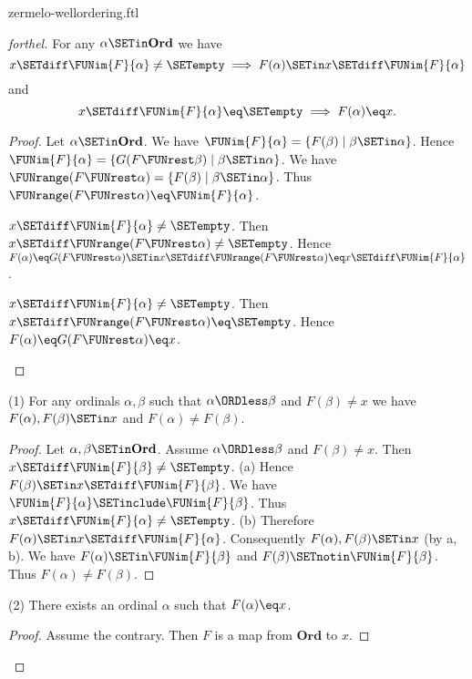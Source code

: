 \documentclass{article}
\newcommand\Ord{\textbf{Ord}}
\begin{document}
\begin{smodule}{zermelo-wellordering.ftl}
\begin{proof}[forthel]
  For any $\alpha \SETin \Ord$ we have
  \[ x \SETdiff \FUNim{F}{\alpha} \neq \SETempty \implies F(\alpha) \SETin x \SETdiff \FUNim{F}{\alpha} \]
  and
  \[ x \SETdiff \FUNim{F}{\alpha} \eq \SETempty \implies F(\alpha) \eq x. \]
  \begin{proof}
    Let $\alpha \SETin \Ord$.
    We have $\FUNim{F}{\alpha} = \{ F(\beta) \mid \beta \SETin \alpha \}$.
    Hence $\FUNim{F}{\alpha} = \{ G(F \FUNrest \beta) \mid \beta \SETin \alpha \}$.
    We have $\FUNrange(F \FUNrest \alpha) = \{ F(\beta) \mid \beta \SETin \alpha \}$.
    Thus $\FUNrange(F \FUNrest \alpha) \eq \FUNim{F}{\alpha}$.

    \begin{case}{$x \SETdiff \FUNim{F}{\alpha} \neq \SETempty$.}
      Then $x \SETdiff \FUNrange(F \FUNrest \alpha) \neq \SETempty$.
      Hence $F(\alpha)
        \eq G(F \FUNrest \alpha)
        \SETin x \SETdiff \FUNrange(F \FUNrest \alpha)
        \eq x \SETdiff \FUNim{F}{\alpha}$.
    \end{case}

    \begin{case}{$x \SETdiff \FUNim{F}{\alpha} \neq \SETempty$.}
      Then $x \SETdiff \FUNrange(F \FUNrest \alpha) \eq \SETempty$.
      Hence $F(\alpha)
        \eq G(F \FUNrest \alpha)
        \eq x$.
    \end{case}
  \end{proof}

  (1) For any ordinals $\alpha, \beta$ such that $\alpha \ORDless \beta$ and $F(\beta) \neq x$ we have $F(\alpha), F(\beta) \SETin x$ and $F(\alpha) \neq F(\beta)$.
  \begin{proof}
    Let $\alpha, \beta \SETin \Ord$.
    Assume $\alpha \ORDless \beta$ and $F(\beta) \neq x$.
    Then $x \SETdiff \FUNim{F}{\beta} \neq \SETempty$.
    (a) Hence $F(\beta) \SETin x \SETdiff \FUNim{F}{\beta}$.
    We have $\FUNim{F}{\alpha} \SETinclude \FUNim{F}{\beta}$.
    Thus $x \SETdiff \FUNim{F}{\alpha} \neq \SETempty$.
    (b) Therefore $F(\alpha) \SETin x \SETdiff \FUNim{F}{\alpha}$.
    Consequently $F(\alpha), F(\beta) \SETin x$ (by a, b).
    We have $F(\alpha) \SETin \FUNim{F}{\beta}$ and $F(\beta) \SETnotin \FUNim{F}{\beta}$.
    Thus $F(\alpha) \neq F(\beta)$.
  \end{proof}

  (2) There exists an ordinal $\alpha$ such that $F(\alpha) \eq x$.
  \begin{proof}
    Assume the contrary.
    Then $F$ is a map from $\Ord$ to $x$.


\end{proof}
\end{proof}
\end{smodule}
\end{document}
